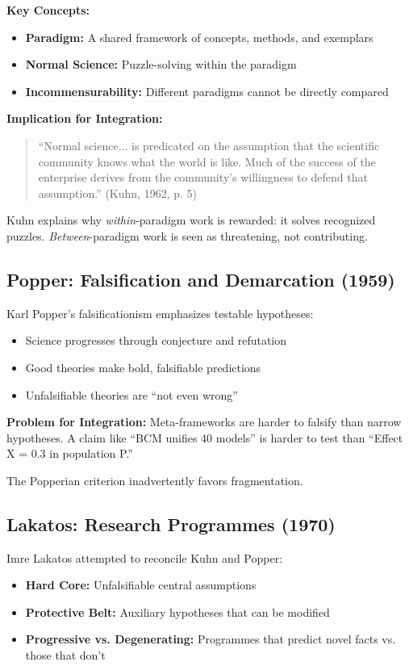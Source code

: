 \textbf{Key Concepts:}
\begin{itemize}
\item \textbf{Paradigm:} A shared framework of concepts, methods, and exemplars
\item \textbf{Normal Science:} Puzzle-solving within the paradigm
\item \textbf{Incommensurability:} Different paradigms cannot be directly compared
\end{itemize}

\textbf{Implication for Integration:}
\begin{quote}
``Normal science... is predicated on the assumption that the scientific community knows what the world is like. Much of the success of the enterprise derives from the community's willingness to defend that assumption.'' (Kuhn, 1962, p. 5)
\end{quote}

Kuhn explains why \textit{within}-paradigm work is rewarded: it solves recognized puzzles. \textit{Between}-paradigm work is seen as threatening, not contributing.

\subsection{Popper: Falsification and Demarcation (1959)}

Karl Popper's falsificationism emphasizes testable hypotheses:
\begin{itemize}
\item Science progresses through conjecture and refutation
\item Good theories make bold, falsifiable predictions
\item Unfalsifiable theories are ``not even wrong''
\end{itemize}

\textbf{Problem for Integration:}
Meta-frameworks are harder to falsify than narrow hypotheses. A claim like ``BCM unifies 40 models'' is harder to test than ``Effect X = 0.3 in population P.''

The Popperian criterion inadvertently favors fragmentation.

\subsection{Lakatos: Research Programmes (1970)}

Imre Lakatos attempted to reconcile Kuhn and Popper:
\begin{itemize}
\item \textbf{Hard Core:} Unfalsifiable central assumptions
\item \textbf{Protective Belt:} Auxiliary hypotheses that can be modified
\item \textbf{Progressive vs. Degenerating:} Programmes that predict novel facts vs. those that don't
\end{itemize}

